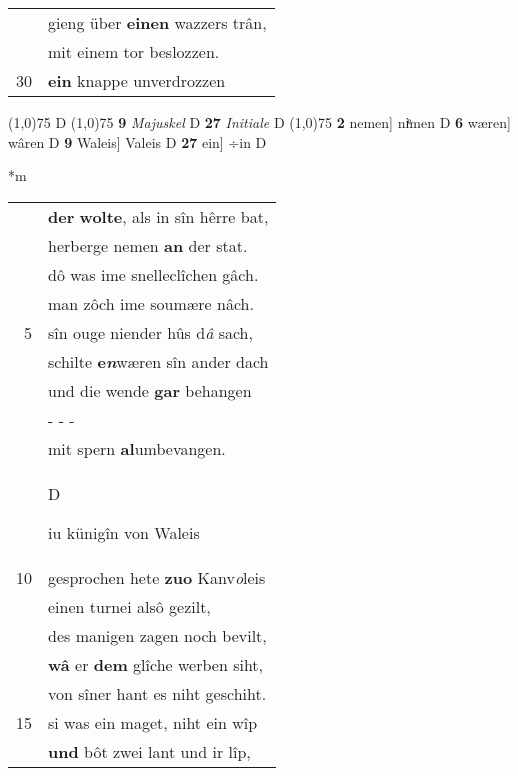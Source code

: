 \documentclass[8pt,a4paper,notitlepage]{article}
\begin{document}
\begin{table}[ht]
\begin{minipage}[t]{0.5\linewidth}
\begin{tabular}{rl}
 & gieng über \textbf{einen} wazzers trân,\\ 
 & mit einem tor beslozzen.\\ 
30 & \textbf{ein} knappe unverdrozzen\\ 
\end{tabular}
\scriptsize
\line(1,0){75} \newline
D \newline
\line(1,0){75} \newline
\textbf{9} \textit{Majuskel} D  \textbf{27} \textit{Initiale} D  \newline
\line(1,0){75} \newline
\textbf{2} nemen] niͤmen D \textbf{6} wæren] wâren D \textbf{9} Waleis] Valeis D \textbf{27} ein] ÷in D \newline
\end{minipage}
\hspace{0.5cm}
\begin{minipage}[t]{0.5\linewidth}
\small
\begin{center}*m
\end{center}
\begin{tabular}{rl}
 & \textbf{der} \textbf{wolte}, als in sîn hêrre bat,\\ 
 & herberge nemen \textbf{an} der stat.\\ 
 & dô was ime snelleclîchen gâch.\\ 
 & man zôch ime soumære nâch.\\ 
5 & sîn ouge niender hûs d\textit{â} sach,\\ 
 & schilte \textbf{e\textit{n}}wæren sîn ander dach\\ 
 & und die wende \textbf{gar} behangen\\ 
 & \multicolumn{1}{l}{ - - - }\\ 
 & mit spern \textbf{al}umbevangen.\\ 
 & \begin{large}D\end{large}iu künigîn von Waleis\\ 
10 & gesprochen hete \textbf{zuo} Kanv\textit{o}leis\\ 
 & einen turnei alsô gezilt,\\ 
 & des manigen zagen noch bevilt,\\ 
 & \textbf{wâ} er \textbf{dem} glîche werben siht,\\ 
 & von sîner hant es niht geschiht.\\ 
15 & si was ein maget, niht ein wîp\\ 
 & \textbf{und} bôt zwei lant und ir lîp,\\ 

\end{tabular}
\end{minipage}
\end{table}
\end{document}
